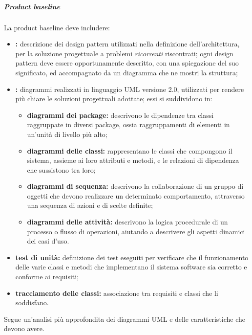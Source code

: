					\subparagraph{Product baseline}
						La product baseline deve includere:
						\begin{itemize}
							\item \textbf{:} descrizione dei design pattern utilizzati nella definizione dell'architettura, per la soluzione progettuale a problemi \textit{ricorrenti} riscontrati; ogni design pattern deve essere opportunamente descritto, con una spiegazione del suo significato, ed accompagnato da un diagramma che ne mostri la struttura;
							\item \textbf{:} diagrammi realizzati in linguaggio UML versione 2.0, utilizzati per rendere più chiare le soluzioni progettuali adottate; essi si suddividono in:
							\begin{itemize}
								\item \textbf{diagrammi dei package:} descrivono le dipendenze tra classi raggruppate in diversi package, ossia raggruppamenti di elementi in un'unità di livello più alto;
								\item \textbf{diagrammi delle classi:} rappresentano le classi che compongono il sistema, assieme ai loro attributi e metodi, e le relazioni di dipendenza che sussistono tra loro;			
								\item \textbf{diagrammi di sequenza:} descrivono la collaborazione di un gruppo di oggetti che devono realizzare un determinato comportamento, attraverso una sequenza di azioni e di scelte definite;
								\item \textbf{diagrammi delle attività:} descrivono la logica procedurale di un processo o flusso di operazioni, aiutando a descrivere gli aspetti dinamici dei casi d'uso.
							\end{itemize}
							\item \textbf{test di unità:} definizione dei test eseguiti per verificare che il funzionamento delle varie classi e metodi che implementano il sistema software sia corretto e conforme ai requisiti;
							\item \textbf{tracciamento delle classi:} associazione tra requisiti e classi che li soddisfano.
						\end{itemize}
					
						Segue un'analisi più approfondita dei diagrammi UML e delle caratteristiche che devono avere.

